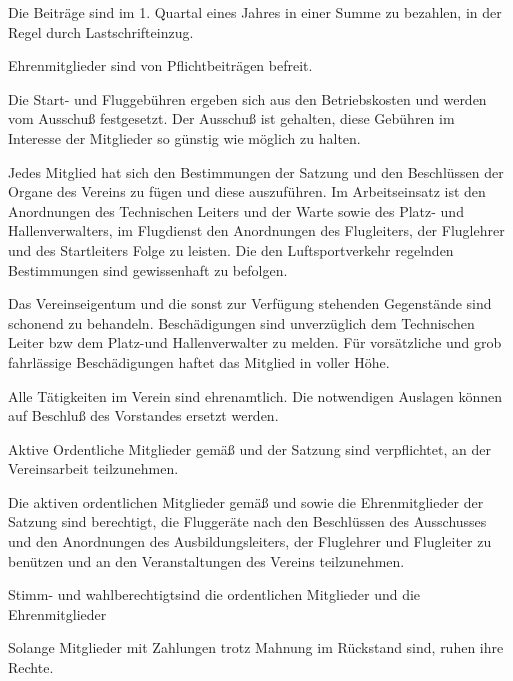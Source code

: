 \documentclass[10pt,a4paper,parskip=half]{scrartcl}
\begin{document}
\begin{contract}
\begin{multicols}{2}
    Die Beiträge sind im 1. Quartal eines Jahres in einer Summe zu bezahlen,
    in der Regel durch Lastschrifteinzug.
    
    Ehrenmitglieder sind von Pflichtbeiträgen befreit.
    
    Die Start- und Fluggebühren ergeben sich aus den Betriebskosten und werden vom Ausschuß festgesetzt.
    Der Ausschuß ist gehalten,
    diese Gebühren im Interesse der Mitglieder so günstig wie möglich zu halten.
    
    
    Jedes Mitglied hat sich den Bestimmungen der Satzung und den Beschlüssen der Organe des Vereins zu fügen und diese auszuführen.
    Im Arbeitseinsatz ist den Anordnungen des Technischen Leiters und der Warte sowie des Platz- und Hallenverwalters,
    im Flugdienst den Anordnungen des Flugleiters,
    der Fluglehrer und des Startleiters Folge zu leisten.
    Die den Luftsportverkehr regelnden Bestimmungen sind gewissenhaft zu befolgen.
    
    Das Vereinseigentum und die sonst zur Verfügung stehenden Gegenstände sind schonend zu behandeln.
    Beschädigungen sind unverzüglich dem Technischen Leiter bzw dem Platz-und Hallenverwalter zu melden.
    Für vorsätzliche und grob fahrlässige Beschädigungen haftet das Mitglied in voller Höhe.
    
    Alle Tätigkeiten im Verein sind ehrenamtlich.
    Die notwendigen Auslagen können auf Beschluß des Vorstandes ersetzt werden.
    
    Aktive Ordentliche Mitglieder gemäß   und  der Satzung sind verpflichtet,
    an der Vereinsarbeit teilzunehmen.
    
    
    Die aktiven ordentlichen Mitglieder gemäß   und 
    sowie die Ehrenmitglieder der Satzung sind berechtigt,
    die Fluggeräte nach den Beschlüssen des Ausschusses und den Anordnungen des Ausbildungsleiters,
    der Fluglehrer und Flugleiter zu benützen und an den Veranstaltungen des Vereins teilzunehmen.
    
    Stimm- und wahlberechtigtsind die ordentlichen Mitglieder und die Ehrenmitglieder
    
    Solange Mitglieder mit Zahlungen trotz Mahnung im Rückstand sind,
    ruhen ihre Rechte.
    

\end{multicols}
\end{contract}
\end{document}
